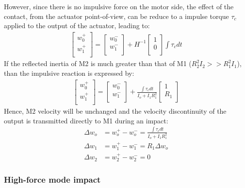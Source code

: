 However, since there is no impulsive force on the motor side, the effect of the contact, from the actuator point-of-view, can be reduce to a impulse torque $\tau_c$ applied to the output of the actuator, leading to:
%
\begin{align}
\left[
\begin{array}{c}
w_0^+ \\
w_1^+ \\
\end{array}
\right] = 
\left[
\begin{array}{c}
w_0^- \\
w_1^- \\
\end{array}
\right] +
H^{-1} \left[
\begin{array}{c}
1 \\
0 \\
\end{array}
\right] \int{\tau_c dt}
\end{align}
%
If the reflected inertia of M2 is much greater than that of M1 ($R_2^2 I_2 >> R_1^2 I_1 $), than the impulsive reaction is expressed by:
%
\begin{align}
\left[
\begin{array}{c}
w_0^+ \\
w_1^+ \\
\end{array}
\right] = 
\left[
\begin{array}{c}
w_0^- \\
w_1^- \\
\end{array}
\right] +
\frac{ \int{\tau_c dt} }{ I_o + I_1 R_1^2} 
\left[
\begin{array}{c}
1 \\
R_1 \\
\end{array}
\right] 
\end{align}
%
Hence, M2 velocity will be unchanged and the velocity discontinuity of the output is transmitted directly to M1 during an impact:
%
\begin{align}
\Delta w_o  &= w_o^+ - w_o^- = \frac{ \int{\tau_c dt} }{ I_o + I_1 R_1^2}  \\
\Delta w_1  &= w_1^+ - w_1^- = R_1 \Delta w_o \\
\Delta w_2  &= w_2^+ - w_2^- =  0
\label{eq:dsdm_impact_gen_delta_w1}
\end{align}


\subsubsection{High-force mode impact}

